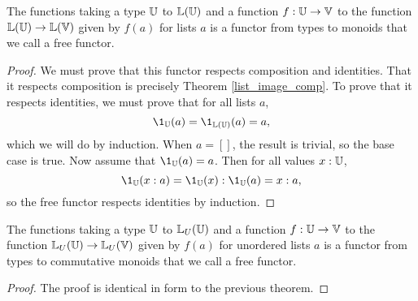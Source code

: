 \documentclass[../math.tex]{subfiles}
\begin{document}
\begin{theorem}
    The functions taking a type $\mathbb{U}$ to $\mathbb{L}(\mathbb{U})$ and a function $f : \mathbb{U} \to \mathbb{V}$
    to the function $\mathbb{L}(\mathbb{U}) \to \mathbb{L}(\mathbb{V})$ given by $f(a)$ for lists $a$ is a
    functor from types to monoids that we call a free functor.
\end{theorem}
\begin{proof}
    We must prove that this functor respects composition and identities.  That
    it respects composition is precisely Theorem \ref{list_image_comp}.  To
    prove that it respects identities, we must prove that for all lists $a$,
    \[
        \1_{\U}(a) = \1_{\L(\U)}(a) = a,
    \]
    which we will do by induction.  When $a = []$, the result is trivial, so the
    base case is true.  Now assume that $\1_{\U}(a) = a$.  Then for all values
    $x : \mathbb{U}$,
    \[
        \1_{\U}(x : a) = \1_{\U}(x) : \1_{\U}(a) = x : a,
    \]
    so the free functor respects identities by induction.
\end{proof}

\begin{theorem}
    The functions taking a type $\mathbb{U}$ to $\mathbb{L}_U(\mathbb{U})$ and a function $f : \mathbb{U} \to
    \mathbb{V}$ to the function $\mathbb{L}_U(\mathbb{U}) \to \mathbb{L}_U(\mathbb{V})$ given by $f(a)$ for unordered
    lists $a$ is a functor from types to commutative monoids that we call a free
    functor.
\end{theorem}
\begin{proof}
    The proof is identical in form to the previous theorem.
\end{proof}
\end{document}
